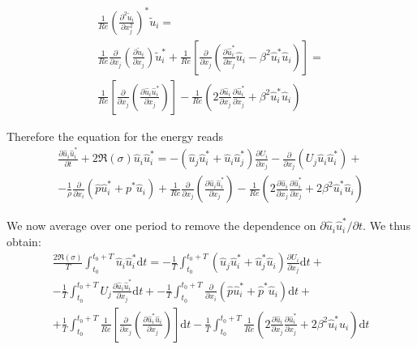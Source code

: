 \begin{itemize}
\begin{equation}
\begin{gathered}
    \frac{1}{Re} \left( \frac{\partial^2 \tilde{u}_i}{\partial x_j^2} \right)^* \tilde{u}_i = \\
    \frac{1}{Re} \frac{\partial}{\partial x_j} \left( \frac{\partial \tilde{u}_i}{\partial x_j} \right) \tilde{u}_i^* +
    \frac{1}{Re} \left[ \frac{\partial}{\partial x_j} \left( \frac{\partial \hat{u}_i^*}{\partial x_j} \hat{u}_i - \beta^2 \hat{u}_i^* \hat{u}_i \right) \right] = \\
    \frac{1}{Re} \left[ \frac{\partial}{\partial x_j} \left( \frac{\partial \hat{u}_i \hat{u}_i^*}{\partial x_j} \right) \right]
   -\frac{1}{Re} \left( 2 \frac{\partial \hat{u}_i}{\partial x_j} \frac{\partial \hat{u}_i^*}{\partial x_j} + \beta^2 \hat{u}_i^* \hat{u}_i \right)
  \end{gathered}
  \end{equation}
\end{itemize}

Therefore the equation for the energy reads
%
\begin{equation}
\begin{gathered}
\frac{\partial \hat{u}_i \hat{u}_i^*}{\partial t} + 2 \Re(\sigma) \hat{u}_i \hat{u}_i^* = 
- \left( \hat{u}_j \hat{u}_i^* + \hat{u}_i \hat{u}_j^* \right) \frac{\partial U_i}{\partial x_j} -
\frac{\partial}{\partial x_j} \left( U_j \hat{u}_i \hat{u}_i^*\right)  + \\
- \frac{1}{\rho} \frac{\partial}{\partial x_i} \left( \hat{p} \hat{u}_i^* + p^* \hat{u}_i \right) +
\frac{1}{Re} \frac{\partial}{\partial x_j} \left( \frac{ \partial \hat{u}_i \hat{u}_i^*}{\partial x_j} \right) 
- \frac{1}{Re} \left( 2 \frac{\partial \hat{u}_i}{\partial x_j} \frac{\partial \hat{u}_i^*}{\partial x_j} + 2 \beta^2 \hat{u}_i^* \hat{u}_i \right) 
\end{gathered} 
\end{equation}

%
We now average over one period to remove the dependence on $\partial \hat{u}_i \hat{u}_i^*/\partial t$. We thus obtain:
%
\begin{equation}
  \begin{gathered}
  \frac{2 \Re(\sigma)}{T} \int_{t_0}^{t_0+T} \hat{u}_i \hat{u}_i^* \text{d}t = 
 -\frac{1}{T} \int_{t_0}^{t_0+T} \left( \hat{u}_j \hat{u}_i^* + \hat{u}_j^* \hat{u}_i \right) \frac{\partial U_i}{\partial x_j} \text{d} t +\\
 -\frac{1}{T} \int_{t_0}^{t_0+T} U_j \frac{\partial \hat{u}_i \hat{u}_i^*}{\partial x_j} \text{d} t + 
 -\frac{1}{T} \int_{t_0}^{t_0+T} \frac{\partial}{\partial x_i} \left( \hat{p} \hat{u}_i^* + \hat{p}^* \hat{u}_i \right) \text{d}t + \\
 +\frac{1}{T} \int_{t_0}^{t_0+T} \frac{1}{Re} \left[ \frac{\partial}{\partial x_j} \left( \frac{\partial \hat{u}_i^* \hat{u}_i }{\partial x_j} \right) \right] \text{d}t 
 -\frac{1}{T} \int_{t_0}^{t_0+T} \frac{1}{Re} \left( 2 \frac{\partial \hat{u}_i}{\partial x_j} \frac{\partial \hat{u}_i^*}{\partial x_j} + 2 \beta^2 \hat{u}_i^* \hat{u}_i \right) \text{d} t
 \end{gathered}
\end{equation}

